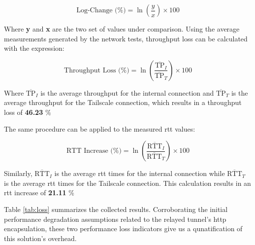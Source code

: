 \documentclass[11pt,twoside,a4paper]{report}
\begin{document}
\[
\text{Log-Change (\%)} = \ln\left(\frac{y}{x}\right) \times 100
\]

Where \textbf{y} and \textbf{x} are the two set of values under comparison. Using the average measurements generated by the network tests, throughput loss can be calculated with the expression:

\[
\text{Throughput Loss (\%)} = \ln\left(\frac{\overline{\text{TP}}_I}{\overline{\text{TP}}_T}\right) \times 100
\]

Where \textbf{ \( \overline{\text{TP}}_I \)} is the average throughput for the internal connection and \textbf{\( \overline{\text{TP}}_T \)} is the average throughput for the Tailscale connection, which results in a throughput loss of \textbf{46.23} \%

The same procedure can be applied to the measured \ac{rtt} values:

\[
\text{RTT Increase (\%)} = \ln\left(\frac{\overline{\text{RTT}}_I}{\overline{\text{RTT}}_T}\right) \times 100
\]

Similarly, \textbf{ \( \overline{\text{RTT}}_I \)} is the average \ac{rtt} times for the internal connection while \textbf{\( \overline{\text{RTT}}_T \)} is the average \ac{rtt} times for the Tailscale connection. This calculation results in an \ac{rtt} increase of \textbf{21.11} \%

Table \ref{tab:loss} summarizes the collected results. Corroborating the initial performance degradation assumptions related to the relayed tunnel's \ac{http} encapsulation, these two performance loss indicators give us a qunatification of this solution's overhead.
\end{document}
